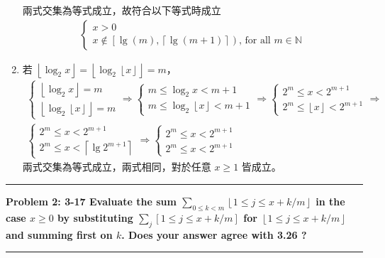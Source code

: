 \documentclass[11pt]{article}
\newcommand\question[2]{\vspace{.25in}\hrule\textbf{#1: #2}\vspace{.5em}\hrule\vspace{.10in}}
\begin{document}
\begin{enumerate}
		兩式交集為等式成立，故符合以下等式時成立
		\begin{align*}
			\left\{\begin{matrix}
				x > 0\\
				x \notin \left [ \lg(m), \left \lceil \lg (m+1) \right \rceil \right ) \text{, for all } m \in \mathbb{N}
			\end{matrix}\right.
		\end{align*}
		
	\item 若 $\left \lfloor \log_2 x \right \rfloor = \left \lfloor \log_2 \left \lfloor x \right \rfloor \right \rfloor = m$，
		\begin{align*}
			\left\{\begin{matrix}
				\left \lfloor \log_2 x \right \rfloor = m\\ 
				\left \lfloor \log_2 \left \lfloor x \right \rfloor \right \rfloor = m
			\end{matrix}\right. 
			\Rightarrow
			\left\{\begin{matrix}
				m \le \log_2 x < m+1 \\ 
				m \le \log_2 \left \lfloor x \right \rfloor < m+1
			\end{matrix}\right.
			\Rightarrow
			\left\{\begin{matrix}
				2^m \le x < 2^{m+1} \\ 
				2^m \le \left \lfloor x \right \rfloor <  2^{m+1}
			\end{matrix}\right.
			\Rightarrow \\
			\left\{\begin{matrix}
				2^m \le x < 2^{m+1} \\ 
				2^m \le x < \left \lceil \lg 2^{m+1} \right \rceil
			\end{matrix}\right.
			\Rightarrow
			\left\{\begin{matrix}
				2^m \le x < 2^{m+1} \\ 
				2^m \le x < 2^{m+1}
			\end{matrix}\right.
		\end{align*}
		兩式交集為等式成立，兩式相同，對於任意 $x \ge 1$ 皆成立。
\end{enumerate}

\question{Problem 2}{3-17  Evaluate the sum 
	$\sum\nolimits_{0 \le k < m} \left \lfloor 1 \le j \le x + k/m \right \rfloor$ in
	the case $x \ge 0$ by substituting 
	$\sum\nolimits_j [1 \le j \le x + k/m]$ for 
	$\left \lfloor 1 \le j \le x + k/m \right \rfloor$
	and summing first on $k$. Does your answer agree with 3.26 ?
}
\end{document}
